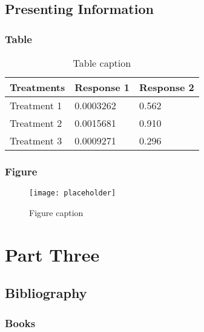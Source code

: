 \documentclass[11pt,fleqn]{book} %
\begin{document}

\chapter{Presenting Information}

\section{Table}

\begin{table}[h]
\centering
\begin{tabular}{l l l}
\toprule
\textbf{Treatments} & \textbf{Response 1} & \textbf{Response 2}\\
\midrule
Treatment 1 & 0.0003262 & 0.562 \\
Treatment 2 & 0.0015681 & 0.910 \\
Treatment 3 & 0.0009271 & 0.296 \\
\bottomrule
\end{tabular}
\caption{Table caption}
\end{table}


\section{Figure}

\begin{figure}[h]
\centering\texttt{[image: placeholder]}
\caption{Figure caption}
\end{figure}

\part[part]{Part Three}

\chapter*{Bibliography}
\section*{Books}
\printbibliography[heading=bibempty,type=book]
\end{document}

